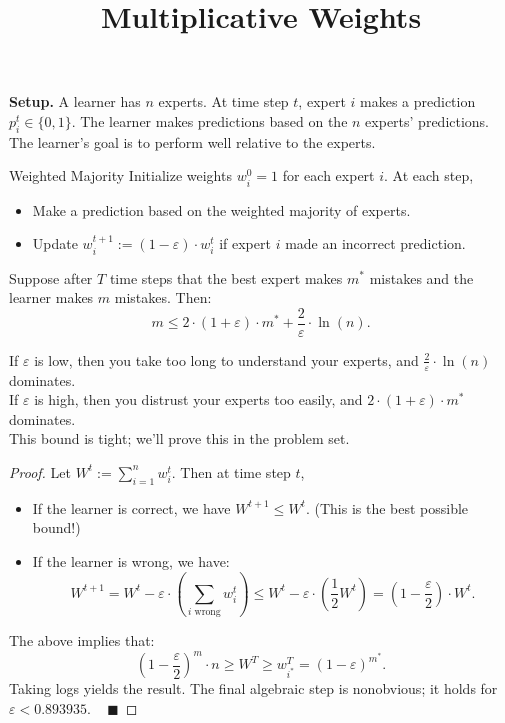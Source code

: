 \title{Multiplicative Weights}



\textbf{Setup.} A learner has $n$ experts.  At time step $t$, expert $i$ makes a prediction $p_i^t \in \{0, 1\}$.  The learner makes predictions based on the $n$ experts' predictions.  The learner's goal is to perform well relative to the experts.

\begin{solution}{Weighted Majority}
    Initialize weights $w_i^0 = 1$ for each expert $i$.  At each step,
    \begin{itemize}
        \item Make a prediction based on the weighted majority of experts.
        \item Update $w_i^{t + 1} := (1 - \varepsilon) \cdot w_i^t$ if expert $i$ made an incorrect prediction.
    \end{itemize}
    Suppose after $T$ time steps that the best expert makes $m^*$ mistakes and the learner makes $m$ mistakes.  Then:
    \[ m \leq 2 \cdot (1 + \varepsilon) \cdot m^* + \frac{2}{\varepsilon} \cdot \ln (n). \]
\end{solution}

\begin{remark}
    If $\varepsilon$ is low, then you take too long to understand your experts, and $\frac{2}{\varepsilon} \cdot \ln(n)$ dominates. \\
    If $\varepsilon$ is high, then you distrust your experts too easily, and $2 \cdot (1 + \varepsilon) \cdot m^*$ dominates. \\
    This bound is tight; we'll prove this in the problem set.
\end{remark}

\begin{proof}
    Let $W^t := \sum_{i = 1}^n w_i^t$.  Then at time step $t$,
    \begin{itemize}
        \item If the learner is correct, we have $W^{t + 1} \leq W^t$.  (This is the best possible bound!)
        \item If the learner is wrong, we have:
        \[ W^{t + 1} = W^t - \varepsilon \cdot \left(\sum_{i \text{ wrong}} w_i^t \right) \leq W^t - \varepsilon \cdot \left(\frac{1}{2}W^t\right) = \left(1 - \frac{\varepsilon}{2}\right) \cdot W^t. \]
    \end{itemize}
    The above implies that:
    \[ \left(1 - \dfrac{\varepsilon}{2}\right)^m \cdot n \geq W^T \geq w_{i^*}^T = (1 - \varepsilon)^{m^*}.  \]
    Taking logs yields the result.  The final algebraic step is nonobvious; it holds for $\varepsilon < 0.893935$.  ~ $\blacksquare$
\end{proof}

